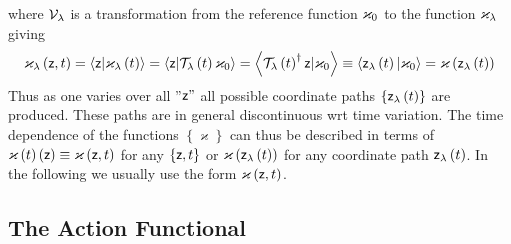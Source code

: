 where ${\cal V}_{\lambda }$ is a transformation from the reference function $%
{\bf \varkappa }_{0}$ to the function ${\bf \varkappa }_{\lambda }$ giving 
\begin{equation}
\varkappa _{\lambda }\left( {\sf z},t\right) =\left\langle {\sf z}|{\bf %
\varkappa }_{\lambda }\left( t\right) \right\rangle =\left\langle {\sf z}|%
{\cal T}_{\lambda }\left( t\right) {\bf \varkappa }_{0}\right\rangle
=\left\langle {\cal T}_{\lambda }\left( t\right) ^{\dagger }{\sf z}|{\bf %
\varkappa }_{0}\right\rangle \equiv \left\langle {\sf z}_{\lambda }\left(
t\right) |{\bf \varkappa }_{0}\right\rangle =\varkappa \left( {\sf z}%
_{\lambda }\left( t\right) \right)
\end{equation}%
Thus as one varies over all {\sf ''}${\sf z"}$ all possible coordinate paths 
$\left\{ {\sf z}_{\lambda }\left( t\right) \right\} $ are produced. These
paths are in general discontinuous wrt time variation. The time dependence
of the functions $\left\{ \varkappa \right\} $ can thus be described in
terms of ${\bf \varkappa }\left( t\right) \left( {\sf z}\right) \equiv
\varkappa \left( {\sf z},t\right) $ for any $\left\{ {\sf z},t\right\} $ or $%
\varkappa \left( {\sf z}_{\lambda }\left( t\right) \right) $ for any
coordinate path ${\sf z}_{\lambda }\left( t\right) $. In the following we
usually use the form $\varkappa \left( {\sf z},t\right) $.

\subsection{The Action Functional}

